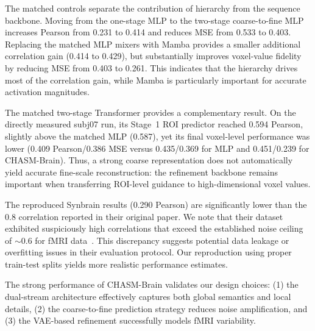 The matched controls separate the contribution of hierarchy from the sequence backbone.
Moving from the one-stage MLP to the two-stage coarse-to-fine MLP increases Pearson
from 0.231 to 0.414 and reduces MSE from 0.533 to 0.403. Replacing the matched MLP
mixers with Mamba provides a smaller additional correlation gain (0.414 to 0.429),
but substantially improves voxel-value fidelity by reducing MSE from 0.403 to 0.261.
This indicates that the hierarchy drives most of the correlation gain, while Mamba
is particularly important for accurate activation magnitudes.

The matched two-stage Transformer provides a complementary result. On the directly
measured subj07 run, its Stage~1 ROI predictor reached 0.594 Pearson, slightly above
the matched MLP (0.587), yet its final voxel-level performance was lower
(0.409 Pearson/0.386 MSE versus 0.435/0.369 for MLP and 0.451/0.239 for CHASM-Brain).
Thus, a strong coarse representation does not automatically yield accurate fine-scale
reconstruction: the refinement backbone remains important when transferring ROI-level
guidance to high-dimensional voxel values.

The reproduced Synbrain results (0.290 Pearson) are significantly lower than
the 0.8 correlation reported in their original paper.
We note that their dataset exhibited suspiciously high correlations that exceed
the established noise ceiling of $\sim$0.6 for fMRI data~\cite{allen2022massive}.
This discrepancy suggests potential data leakage or overfitting issues in their evaluation protocol.
Our reproduction using proper train-test splits yields more realistic performance estimates.

The strong performance of CHASM-Brain validates our design choices:
(1) the dual-stream architecture effectively captures both global semantics and local details,
(2) the coarse-to-fine prediction strategy reduces noise amplification,
and (3) the VAE-based refinement successfully models fMRI variability.

